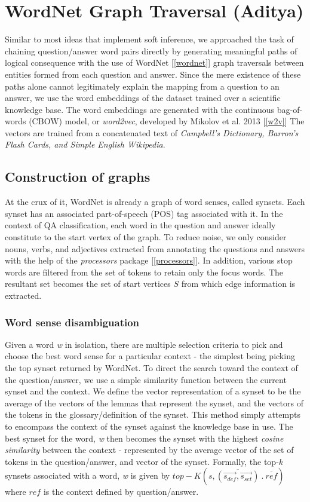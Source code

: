 \section{WordNet Graph Traversal (Aditya)}
Similar to most ideas that implement soft inference, we approached the task of chaining
question/answer word pairs directly by generating meaningful paths of logical consequence
with the use of WordNet [\ref{wordnet}] graph traversals between entities formed from
each question and answer. Since the mere existence of these paths alone cannot legitimately
explain the mapping from a question to an answer, we use the word embeddings of the dataset
trained over a scientific knowledge base. The word embeddings are generated with the 
continuous bag-of-words (CBOW) model, or \emph{word2vec}, developed by Mikolov et al. 2013 [\ref{w2v}]
The vectors are trained from a concatenated text of \emph{Campbell's Dictionary, Barron's Flash Cards,
and Simple English Wikipedia}.

\subsection{Construction of graphs}
At the crux of it, WordNet is already a graph of word senses, called synsets. Each synset has 
an associated part-of-speech (POS) tag associated with it. In the context of QA classification,
each word in the question and answer ideally constitute to the start vertex of the graph.
To reduce noise, we only consider nouns, verbs, and adjectives extracted from annotating the 
questions and answers with the help of the \emph{processors} package [\ref{processors}]. 
In addition, various stop words are filtered from the set of tokens to retain only the focus words. 
The resultant set becomes the set of start vertices $S$ from which edge information is extracted.

\subsubsection{Word sense disambiguation}
Given a word \emph{w} in isolation, there are multiple selection criteria to pick and choose the 
best word sense for a particular context - the simplest being picking the top synset returned by
WordNet. To direct the search toward the context of the question/answer, we use a simple similarity
function between the current synset and the context. We define the vector representation of a 
synset to be the average of the vectors of the lemmas that represent the synset, and the vectors of
the tokens in the glossary/definition of the synset. This method simply attempts to encompass the
context of the synset against the knowledge base in use. The best synset for the word, \emph{w} then
becomes the synset with the highest \emph{cosine similarity} between the context - represented
by the average vector of the set of tokens in the question/answer, and vector of the synset.
Formally, the top-$k$ synsets associated with a word, \emph{w} is given by
$top-K(s, \overline{(\vec{s_{def}}, \vec{s_{set}})}\ \textbf{.}\ \overline{ref})$ where $ref$ is
the context defined by question/answer.

